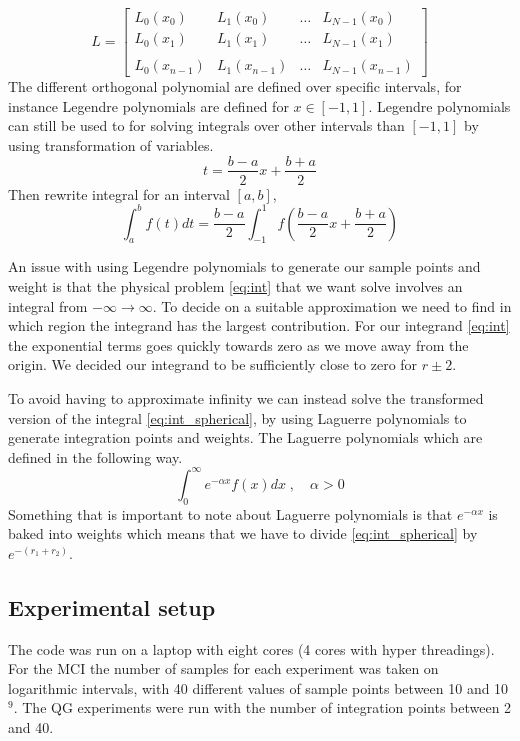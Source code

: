 \begin{equation}\label{eq:ort_matrix}
  L = \begin{bmatrix}
    L_0(x_0) & L_1(x_0) & \dots & L_{N-1}(x_{0}) \\
    L_0(x_1) & L_1(x_1) & \dots & L_{N-1}(x_{1}) \\
    \\
    L_0(x_{n-1}) & L_1(x_{n-1}) & \dots & L_{N-1}(x_{n-1})
  \end{bmatrix}
\end{equation}
The different orthogonal polynomial are defined over specific intervals, for
instance Legendre polynomials are defined for $x \in [-1, 1]$. Legendre
polynomials can still be used to for solving integrals over other intervals
than $[-1,1]$ by using transformation of variables.
\begin{equation}
  t = \frac{b-a}{2}x + \frac{b+a}{2}
\end{equation}
Then rewrite integral for an interval $[a,b]$,
\begin{equation}
  \int_a^b f(t)dt = \frac{b-a}{2}\int_{-1}^{1} f\left(\frac{b-a}{2}x + \frac{b+a}{2}\right)
\end{equation}

An issue with using Legendre polynomials to generate our sample points and
weight is that the physical problem \cref{eq:int} that we want solve involves an
integral from $-\infty \to \infty$. To decide on a suitable approximation we
need to find in which region the integrand has the largest contribution. For our
integrand \cref{eq:int} the exponential terms goes quickly towards zero as we
move away from the origin. We decided our integrand to be sufficiently close to
zero for $r \pm 2 $.
  
To avoid having to approximate infinity we can instead solve the
transformed version of the integral \cref{eq:int_spherical}, by using Laguerre
polynomials to generate integration points and weights. The Laguerre polynomials
which are defined in the following way.
\begin{equation}\label{eq:laguerre}
  \int_0^{\infty} e^{-\alpha x} f(x)dx \; , \quad \alpha > 0
\end{equation}
Something that is important to note about Laguerre polynomials is that
$e^{-\alpha x}$ is baked into weights which means that we have to divide
\cref{eq:int_spherical} by $e^{-(r_1 + r_2)}$.



\subsection{Experimental setup}

The code was run on a laptop with eight cores (4 cores with hyper threadings). For the MCI the number of samples
for each experiment was taken on logarithmic intervals, with 40 different values
of sample points between 10 and 10$^9$. The QG experiments were run with the number
of integration points between 2 and 40.
